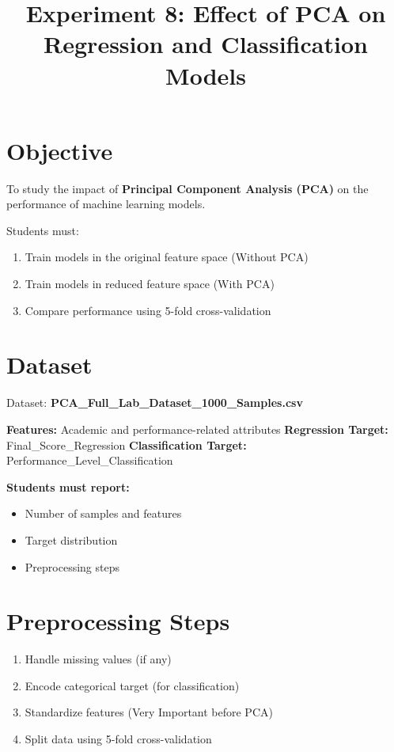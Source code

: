 \documentclass[11pt]{article}
\title{\textbf{Experiment 8: Effect of PCA on Regression and Classification Models}}
\author{}
\date{}
\begin{document}
\maketitle

\section*{Objective}

To study the impact of \textbf{Principal Component Analysis (PCA)} 
on the performance of machine learning models.

Students must:

\begin{enumerate}[label=\alph*)]
    \item Train models in the original feature space (Without PCA)
    \item Train models in reduced feature space (With PCA)
    \item Compare performance using 5-fold cross-validation
\end{enumerate}

\section*{Dataset}

Dataset: \textbf{PCA\_Full\_Lab\_Dataset\_1000\_Samples.csv}

\textbf{Features:} Academic and performance-related attributes  
\textbf{Regression Target:} Final\_Score\_Regression  
\textbf{Classification Target:} Performance\_Level\_Classification  

\textbf{Students must report:}
\begin{itemize}
    \item Number of samples and features
    \item Target distribution
    \item Preprocessing steps
\end{itemize}

\section*{Preprocessing Steps}

\begin{enumerate}
    \item Handle missing values (if any)
    \item Encode categorical target (for classification)
    \item Standardize features (Very Important before PCA)
    \item Split data using 5-fold cross-validation
\end{enumerate}
\end{document}
